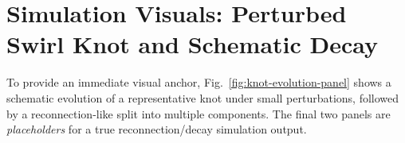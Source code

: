 \documentclass[10pt]{article}
\begin{document}
\section{Simulation Visuals: Perturbed Swirl Knot and Schematic Decay}
\label{sec:v076-sim-visuals}

To provide an immediate visual anchor, Fig.~\ref{fig:knot-evolution-panel} shows a schematic evolution
of a representative knot under small perturbations, followed by a reconnection-like split into multiple
components. The final two panels are \emph{placeholders} for a true reconnection/decay simulation output.

\begin{figure}[h]
    \centering

\end{figure}
\end{document}
